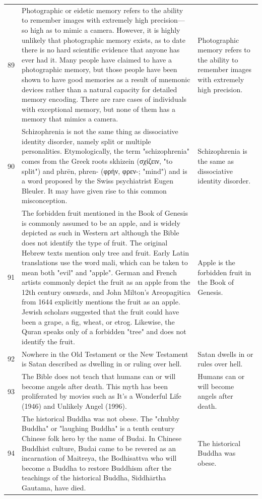 \begin{tabular}{c|p{}|p{}}
89 & Photographic or eidetic memory refers to the ability to remember images with extremely high precision—so high as to mimic a camera. However, it is highly unlikely that photographic memory exists, as to date there is no hard scientific evidence that anyone has ever had it. Many people have claimed to have a photographic memory, but those people have been shown to have good memories as a result of mnemonic devices rather than a natural capacity for detailed memory encoding. There are rare cases of individuals with exceptional memory, but none of them has a memory that mimics a camera. & Photographic memory refers to the ability to remember images with extremely high precision. \\
90 & Schizophrenia is not the same thing as dissociative identity disorder, namely split or multiple personalities. Etymologically, the term "schizophrenia" comes from the Greek roots skhizein (σχίζειν, "to split") and phrēn, phren- (φρήν, φρεν-; "mind") and is a word proposed by the Swiss psychiatrist Eugen Bleuler. It may have given rise to this common misconception. & Schizophrenia is the same as dissociative identity disorder. \\
91 & The forbidden fruit mentioned in the Book of Genesis is commonly assumed to be an apple, and is widely depicted as such in Western art although the Bible does not identify the type of fruit. The original Hebrew texts mention only tree and fruit. Early Latin translations use the word mali, which can be taken to mean both "evil" and "apple". German and French artists commonly depict the fruit as an apple from the 12th century onwards, and John Milton's Areopagitica from 1644 explicitly mentions the fruit as an apple. Jewish scholars suggested that the fruit could have been a grape, a fig, wheat, or etrog. Likewise, the Quran speaks only of a forbidden "tree" and does not identify the fruit. & Apple is the forbidden fruit in the Book of Genesis. \\
92 & Nowhere in the Old Testament or the New Testament is Satan described as dwelling in or ruling over hell. & Satan dwells in or rules over hell. \\
93 & The Bible does not teach that humans can or will become angels after death. This myth has been proliferated by movies such as It's a Wonderful Life (1946) and Unlikely Angel (1996). & Humans can or will become angels after death. \\
94 & The historical Buddha was not obese. The "chubby Buddha" or "laughing Buddha" is a tenth century Chinese folk hero by the name of Budai. In Chinese Buddhist culture, Budai came to be revered as an incarnation of Maitreya, the Bodhisattva who will become a Buddha to restore Buddhism after the teachings of the historical Buddha, Siddhārtha Gautama, have died. & The historical Buddha was obese. \\

\end{tabular}

